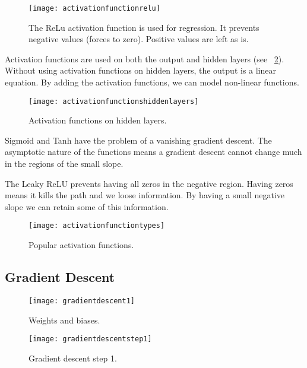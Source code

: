  	\begin{figure}[htb]
		\centering
		\texttt{[image: activationfunctionrelu]}
		\caption[The ReLu activation function]{The ReLu activation function is used for regression.  It prevents negative values (forces to zero).  Positive values are left as is.}
		\label{fig:activationfunctionrelu}
	\end{figure}

Activation functions are used on both the output and hidden layers (see \figurename~\ref{fig:activationfunctionshiddenlayers}).  Without using activation functions on hidden layers, the output is a linear equation.  By adding the activation functions, we can model non-linear functions.

 	\begin{figure}[htb]
		\centering
		\texttt{[image: activationfunctionshiddenlayers]}
		\caption[Activation functions on hidden layers]{Activation functions on hidden layers.}
		\label{fig:activationfunctionshiddenlayers}
	\end{figure}

Sigmoid and Tanh have the problem of a vanishing gradient descent.  The asymptotic nature of the functions means a gradient descent cannot change much in the regions of the small slope.

The Leaky ReLU prevents having all zeros in the negative region.  Having zeros means it kills the path and we loose information.  By having a small negative slope we can retain some of this information.

 	\begin{figure}[htb]
		\centering
		\texttt{[image: activationfunctiontypes]}
		\caption[Popular activation functions]{Popular activation functions.}
		\label{fig:activationfunctiontypes}
	\end{figure}

	\subsection{Gradient Descent}

 	\begin{figure}[htb]
		\centering
		\texttt{[image: gradientdescent1]}
		\caption[Weights and biases]{Weights and biases.}
		\label{fig:gradientdescent1}
	\end{figure}


 	\begin{figure}[htb]
		\centering
		\texttt{[image: gradientdescentstep1]}
		\caption[Gradient descent step 1]{Gradient descent step 1.}
		\label{fig:gradientdescentstep1}
	\end{figure}

